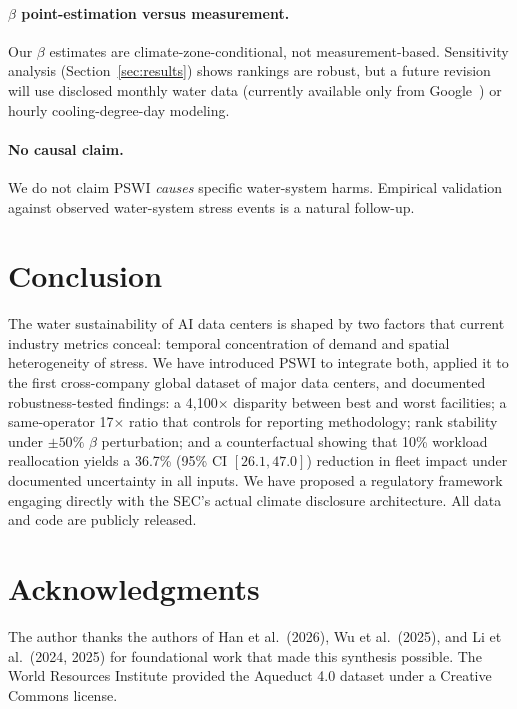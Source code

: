 \documentclass[conference,10pt]{IEEEtran}
\begin{document}
\paragraph{$\beta$ point-estimation versus measurement.}
Our $\beta$ estimates are climate-zone-conditional, not measurement-based.
Sensitivity analysis (Section~\ref{sec:results}) shows rankings are
robust, but a future revision will use disclosed monthly water data
(currently available only from Google~\cite{google2025envreport}) or
hourly cooling-degree-day modeling.

\paragraph{No causal claim.}
We do not claim PSWI \emph{causes} specific water-system harms.
Empirical validation against observed water-system stress events is a
natural follow-up.

\section{Conclusion}
\label{sec:conclusion}

The water sustainability of AI data centers is shaped by two factors
that current industry metrics conceal: temporal concentration of
demand and spatial heterogeneity of stress. We have introduced PSWI
to integrate both, applied it to the first cross-company global
dataset of major data centers, and documented robustness-tested
findings: a 4{,}100$\times$ disparity between best and worst facilities;
a same-operator 17$\times$ ratio that controls for reporting
methodology; rank stability under $\pm 50\%$ $\beta$ perturbation;
and a counterfactual showing that 10\% workload reallocation yields a
36.7\% (95\% CI $[26.1, 47.0]$) reduction in fleet impact under
documented uncertainty in all inputs. We have proposed a regulatory
framework engaging directly with the SEC's actual climate disclosure
architecture. All data and code are publicly released.

\section*{Acknowledgments}

The author thanks the authors of Han et al.~(2026), Wu et al.~(2025),
and Li et al.~(2024, 2025) for foundational work that made this
synthesis possible. The World Resources Institute provided the
Aqueduct 4.0 dataset under a Creative Commons license.



\end{document}
